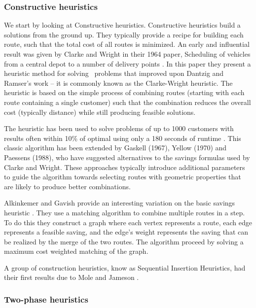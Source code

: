 \subsubsection{Constructive heuristics}

We start by looking at Constructive heuristics. Constructive heuristics build a solutions from the ground up. They typically provide a recipe for building each route, such that the total cost of all routes is minimized. An early and influential result was given by Clarke and Wright in their 1964 paper, Scheduling of vehicles from a central depot to a number of delivery points \cite{clark:1964}. In this paper they present a heuristic method for solving \VRP\ problems that improved upon Dantzig and Ramser's work -- it is commonly known as the Clarke-Wright heuristic. The heuristic is based on the simple process of combining routes (starting with each route containing a single customer) such that the combination reduces the overall cost (typically distance) while still producing feasible solutions.

The heuristic has been used to solve problems of up to 1000 customers with results often within 10\% of optimal using only a 180 seconds of runtime \cite{TV2001}. This classic algorithm has been extended by Gaskell (1967), Yellow (1970) and Paessens (1988), who have suggested alternatives to the savings formulas used by Clarke and Wright. These approaches typically introduce additional parameters to guide the algorithm towards selecting routes with geometric properties that are likely to produce better combinations.

Alkinkemer and Gavish provide an interesting variation on the basic savings heuristic \cite{AG:1991}. They use a matching algorithm to combine multiple routes in a step. To do this they construct a graph where each vertex represents a route, each edge represents a feasible saving, and the edge's weight represents the saving that can be realized by the merge of the two routes. The algorithm proceed by solving a maximum cost weighted matching of the graph.

A group of construction heuristics, know as Sequential Insertion Heuristics, had their first results due to Mole and Jameson \cite{MJ:1976}.

\subsubsection{Two-phase heuristics}
\label{twophaseheuristics}

